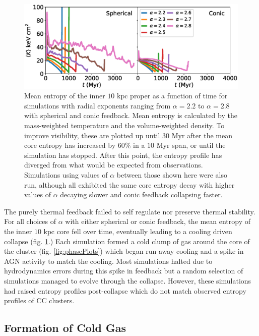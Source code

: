 \documentclass[iop,apjl, twocolappendix]{emulateapj}   %
\begin{document}
\begin{figure}
  \begin{center}
    \includegraphics[width=1\linewidth]{figures/avgCoreEntropies.eps}
  \end{center}
  \caption{
    \label{fig:avgCoreEntropies}
    Mean entropy of the inner $10 \text{ kpc}$ proper as a function of time for
    simulations with radial exponents ranging from $\alpha=2.2$ to $\alpha=2.8$
    with spherical and conic feedback.  Mean entropy is calculated by the
    mass-weighted temperature and the volume-weighted density. To improve
    visibility, these are plotted up until $30 \text{ Myr}$ after the mean core
    entropy has increased by $60\%$ in a $10 \text{ Myr}$ span, or until the
    simulation has stopped. After this point, the entropy profile has diverged
    from what would be expected from observations. Simulations using values of
    $\alpha$ between those shown here were also run, although all exhibited the
    same core entropy decay with higher values of $\alpha$ decaying slower and
    conic feedback collapsing faster.
  }
\end{figure}

The purely thermal feedback failed to self regulate nor preserve thermal
stability. For all choices of $\alpha$ with either spherical or conic feedback,
the mean entropy of the inner $10 \text{ kpc}$ core fell over time, eventually
leading to a cooling driven collapse (fig. \ref{fig:avgCoreEntropies}.) Each
simulation formed a cold clump of gas around the core of the cluster (fig.
\ref{fig:phasePlots}) which began run away cooling and a spike in AGN activity
to match the cooling. Most simulations halted due
to hydrodynamics errors during this spike in feedback but a random selection of
simulations managed to evolve through the collapse. However, these simulations
had raised entropy profiles post-collapse which do not match observed entropy
profiles of CC clusters.

\subsection{Formation of Cold Gas}
\label{sec:formation_of_cold_gas}
\end{document}
